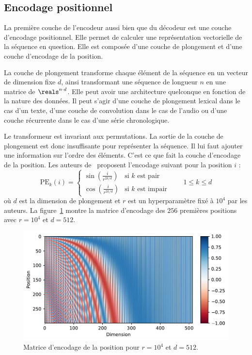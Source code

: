 \subsection{Encodage positionnel}

La première couche de l'encodeur aussi bien que du décodeur est une couche d'encodage positionnel.
Elle permet de calculer une représentation vectorielle de la séquence en question.
Elle est composée d'une couche de plongement et d'une couche d'encodage de la position.

La couche de plongement transforme chaque élément de la séquence en un vecteur de dimension fixe \(d\),
ainsi transformant une séquence de longueur \(n\) en une matrice de \(\reals^{n \cdot d}\).
Elle peut avoir une architecture quelconque en fonction de la nature des données.
Il peut s'agir d'une couche de plongement lexical dans le cas d'un texte, 
d'une couche de convolution dans le cas de l'audio 
ou d'une couche récurrente dans le cas d'une série chronologique.

Le transformeur est invariant aux permutations.
La sortie de la couche de plongement est donc insuffisante pour représenter la séquence.
Il lui faut ajouter une information sur l'ordre des éléments.
C'est ce que fait la couche d'encodage de la position.
Les auteurs de~\cite{attention} proposent l'encodage suivant pour la position \(i\) :
\begin{equation}
    \label{eq.sine-positional-encoding}
    \mathrm{PE}_{k}(i) = 
    \begin{cases}
        \sin\left(\frac{i}{r^{2k/d}}\right) & \text{si } k \text{ est pair} \\
        \cos\left(\frac{i}{r^{2k/d}}\right) & \text{si } k \text{ est impair}
    \end{cases} \qquad 1 \le k \le d
\end{equation}
où \(d\) est la dimension de plongement et \(r\) est un hyperparamètre fixé à \(10^4\) par les auteurs.
La figure~\ref{fig.positional-encoding} montre la matrice d'encodage des \(256\) premières positions
avec \(r=10^4\) et \(d=512\).

\begin{figure}[htb]
    \centering
    \includegraphics[width=12cm]{assets/python/positional_embedding.pdf}
    \caption{Matrice d'encodage de la position pour \(r=10^4\) et \(d=512\).}
    \label{fig.positional-encoding}
\end{figure}

